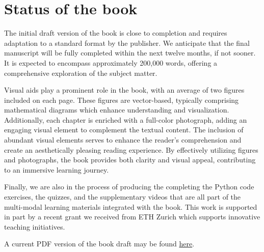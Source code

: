 \documentclass[10pt, article, one side]{memoir}
\begin{document}
    \section{Status of the book}
    The initial draft version of the book is close to completion and requires adaptation to a standard format by the publisher. We anticipate that the final manuscript will be fully completed within the next twelve months, if not sooner. It is expected to encompass approximately 200,000 words, offering a comprehensive exploration of the subject matter. 
    
    Visual aids play a prominent role in the book, with an average of two figures included on each page. These figures are vector-based, typically comprising mathematical diagrams which enhance understanding and visualization.
    Additionally, each chapter is enriched with a full-color photograph, adding an engaging visual element to complement the textual content. The inclusion of abundant visual elements serves to enhance the reader's comprehension and create an aesthetically pleasing reading experience.
    By effectively utilizing figures and photographs, the book provides both clarity and visual appeal, contributing to an immersive learning journey.
    
    Finally, we are also in the process of producing the completing the Python code exercises, the quizzes, and the supplementary videos that are all part of the multi-modal learning materials integrated with the book. This work is supported in part by a recent grant we received from ETH Zurich which supports innovative teaching initiatives. 
        
    A current PDF version of the book draft may be found \href{https://z7-stage-act4e-book.zuper.ai/sync/ACT4E/ACT4E/alphubel-prod/build/last/build-public/ACT4E-public.pdf}{here}.
\end{document}

